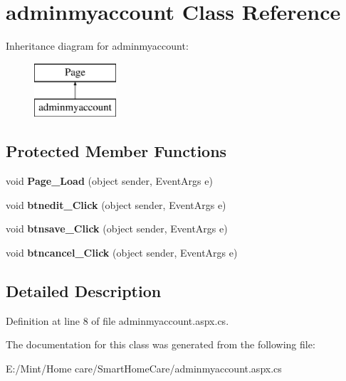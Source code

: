\hypertarget{classadminmyaccount}{\section{adminmyaccount Class Reference}
\label{classadminmyaccount}
}
Inheritance diagram for adminmyaccount\-:\begin{figure}[H]
\begin{center}
\leavevmode
\includegraphics[height=2.000000cm]{classadminmyaccount}
\end{center}
\end{figure}
\subsection*{Protected Member Functions}
\begin{DoxyCompactItemize}
\item 
\hypertarget{classadminmyaccount_af3bc2358b578da42fdcde6e35d83d807}{void {\bfseries Page\-\_\-\-Load} (object sender, Event\-Args e)}\label{classadminmyaccount_af3bc2358b578da42fdcde6e35d83d807}

\item 
\hypertarget{classadminmyaccount_ab1ceb89cf05222cf5f61eb9c9e6f460b}{void {\bfseries btnedit\-\_\-\-Click} (object sender, Event\-Args e)}\label{classadminmyaccount_ab1ceb89cf05222cf5f61eb9c9e6f460b}

\item 
\hypertarget{classadminmyaccount_af54811c66f1b8f8bbfe164c6c6ad8ed2}{void {\bfseries btnsave\-\_\-\-Click} (object sender, Event\-Args e)}\label{classadminmyaccount_af54811c66f1b8f8bbfe164c6c6ad8ed2}

\item 
\hypertarget{classadminmyaccount_aebf1f3c30c02c4ed5c4f5068c8627299}{void {\bfseries btncancel\-\_\-\-Click} (object sender, Event\-Args e)}\label{classadminmyaccount_aebf1f3c30c02c4ed5c4f5068c8627299}

\end{DoxyCompactItemize}


\subsection{Detailed Description}


Definition at line 8 of file adminmyaccount.\-aspx.\-cs.



The documentation for this class was generated from the following file\-:\begin{DoxyCompactItemize}
\item 
E\-:/\-Mint/\-Home care/\-Smart\-Home\-Care/adminmyaccount.\-aspx.\-cs\end{DoxyCompactItemize}
